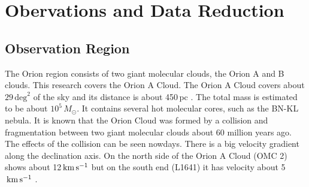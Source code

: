 \section{Obervations and Data Reduction}

\subsection{Observation Region}
The Orion region consists of two giant molecular clouds, the Orion A and B clouds. This research covers the Orion A Cloud. The Orion A Cloud covers about $29 \, \textrm{deg}^2$ of the sky and its distance is about 450$\,$pc \cite{kounkel2017gould}. The total mass is estimated to be about $10^5 \, M_{\odot}$. It contains several hot molecular cores, such as the BN-KL nebula. It is known that the Orion Cloud was formed by a collision and fragmentation between two giant molecular clouds about 60 million years ago. The effects of the collision can be seen nowdays. There is a big velocity gradient along the declination axis. On the north side of the Orion A Cloud (OMC 2) shows about 12$\, \rm km\,s^{-1}$ but on the south end (L1641) it has velocity about 5$\, \rm km\,s^{-1}$ \cite{schulz2012formation}.

